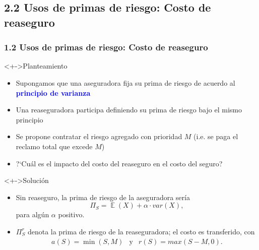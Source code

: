 \documentclass[cjk,t,compress]{beamer}
\newcommand{\field}[1]{\mathbb{#1}}
\newcommand{\expec}{\operatorname{\field{E}}}
\renewcommand{\min}{\operatorname{\text{min}}}
\begin{document}
%
%
\subsection{2.2 Usos de primas de riesgo: Costo de reaseguro}
\begin{frame}[fragile]
	\frametitle{1.2 Usos de primas de riesgo: Costo de reaseguro}
	\scriptsize  	
		
		\vspace{0.1cm}
		\begin{block}<+->{Planteamiento}
		\begin{itemize}
		 \item 
		Supongamos que una aseguradora fija su prima de riesgo de acuerdo al \textcolor{blue}{\bf principio de varianza}
		 
		 \item Una reaseguradora participa definiendo su prima de riesgo bajo el mismo principio
		 
		 \item Se propone contratar el riesgo agregado con prioridad $M$ (i.e. se paga el reclamo total que excede $M$) 
		
		 \item \textcolor{MyDarkTerracota}{?`Cu\'al es el impacto del costo del reaseguro en el costo del seguro?}
		\end{itemize}
		\end{block}  		
				
		\vspace{0.1cm}
		\begin{block}<+->{Soluci\'on}
		\vspace{0.3cm}
		\begin{itemize}
		  \item Sin reaseguro, la prima de riesgo de la aseguradora ser\'ia
		\begin{equation}
		\Pi_S = \expec\left(X\right)+\alpha \cdot var\left(X\right),
		\nonumber
		\end{equation}
		para alg\'un $\alpha$ positivo.
		  \item $\Pi^{r}_{S}$ denota la prima de riesgo de la reaseguradora; el costo es transferido, con 
		  \begin{eqnarray}
		  a(S)=\min(S,M) & \text{y} & r(S)=max(S-M,0).
		  \nonumber
		  \end{eqnarray}
		  
		\end{itemize}
		\end{block}  	
\end{frame}
\end{document}
